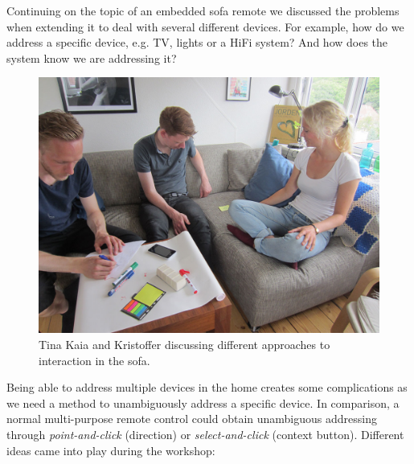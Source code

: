 Continuing on the topic of an embedded sofa remote we discussed the problems when extending it to deal with several different devices.
For example, how do we address a specific device, e.g. TV, lights or a HiFi system? And how does the system know we are addressing it?
\blank

\begin{figure}[h]
  \centering
  \includegraphics[width=.9\textwidth]{figures/kaia_moos2}
  \caption{Tina Kaia and Kristoffer discussing different approaches to interaction in the sofa.}
   \label{kaia_moos2}
\end{figure}

Being able to address multiple devices in the home creates some complications as we need a method to unambiguously address a specific device.
In comparison, a normal multi-purpose remote control could obtain unambiguous addressing through \emph{point-and-click} (direction) or \emph{select-and-click} (context button).
Different ideas came into play during the workshop:

